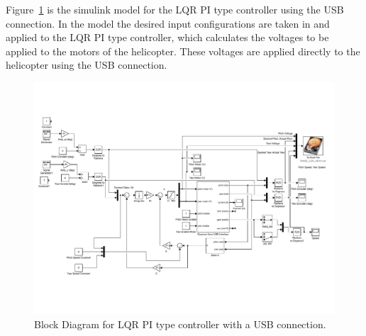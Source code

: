 Figure~\ref{fig:LQR_PI_USB_Block_Diagram} is the simulink model for the LQR PI type controller using the USB connection.  In the model the desired input configurations are taken in and applied to the LQR PI type controller, which calculates the voltages to be applied to the motors of the helicopter.  These voltages are applied directly to the helicopter using the USB connection.
\begin{figure}[!htbp]
    \centering
    \includegraphics[width=.8\textwidth,keepaspectratio=true]{figs/img/LQR_PI_USB}
    \caption{Block Diagram for LQR PI type controller with a USB connection.}
    \label{fig:LQR_PI_USB_Block_Diagram}
\end{figure}

